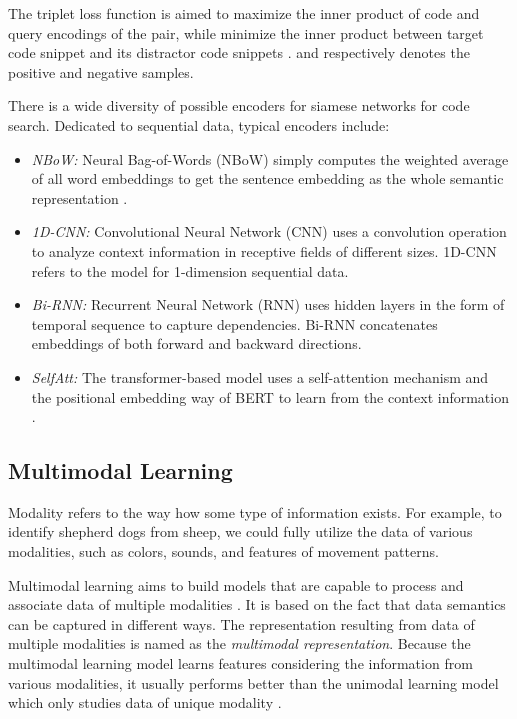\documentclass[conference]{IEEEtran}
\begin{document}
The triplet loss function is aimed to maximize the inner product of code  and query  encodings of the pair, while minimize the inner product between target code snippet  and its distractor code snippets   \cite{Husain2019CodeSearchNetCE}.  and  respectively denotes the positive and negative samples.

There is a wide diversity of possible encoders for siamese networks for code search. Dedicated to sequential data, typical encoders include:
\begin{itemize}
  \item \emph{NBoW:} Neural Bag-of-Words (NBoW) simply computes the weighted average of all word embeddings to get the sentence embedding as the whole semantic representation \cite{Kalchbrenner2014ACN,Iyyer2015DeepUC}.
\item \emph{1D-CNN:} Convolutional Neural Network (CNN) \cite{Kim2014ConvolutionalNN} uses a convolution operation to analyze context information in receptive fields of different sizes. 1D-CNN refers to the model for 1-dimension sequential data.
  \item \emph{Bi-RNN:} Recurrent Neural Network (RNN) \cite{Elman1990FindingSI} uses hidden layers in the form of temporal sequence to capture dependencies. Bi-RNN concatenates embeddings of both forward and backward directions. \item \emph{SelfAtt:} The transformer-based model uses a self-attention mechanism and the positional embedding way of BERT to learn from the context information \cite{Vaswani2017AttentionIA,Devlin2019BERTPO}.
\end{itemize}

\subsection{Multimodal Learning}

Modality refers to the way how some type of information exists. For example, to identify shepherd dogs from sheep, we could fully utilize the data of various modalities, such as colors, sounds, and features of movement patterns.

Multimodal learning aims to build models that are capable to process and associate data of multiple modalities \cite{Baltruaitis2019MultimodalML}. It is based on the fact that data semantics can be captured in different ways. The representation resulting from data of multiple modalities is named as the \emph{multimodal representation}. Because the multimodal learning model learns features considering the information from various modalities, it usually performs better than the unimodal learning model which only studies data of unique modality \cite{Ngiam2011MultimodalDL}.
\end{document}
